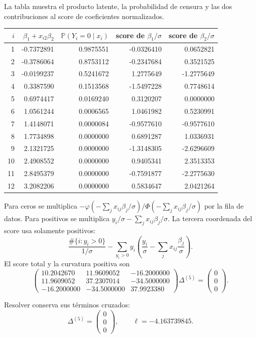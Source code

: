 \documentclass[11pt,a4paper]{article}
\newcommand{\Prob}{\mathbb P}
\begin{document}
La tabla muestra el producto latente,
la probabilidad de censura y
las dos contribuciones al score
de coeficientes normalizados.
\begin{center}\small\begin{tabular}{rrrrr}\toprule
\(i\)&\(\beta_1+x_{i2}\beta_2\)&\(\Prob(Y_i=0\mid x_i)\)&score de \(\beta_1/\sigma\)&score de \(\beta_2/\sigma\)\\\midrule
1&-0.7372891&0.9875551&-0.0326410&0.0652821\\
2&-0.3786064&0.8753112&-0.2347684&0.3521525\\
3&-0.0199237&0.5241672&1.2775649&-1.2775649\\
4&0.3387590&0.1513568&-1.5497228&0.7748614\\
5&0.6974417&0.0169240&0.3120207&0.0000000\\
6&1.0561244&0.0006565&1.0461982&0.5230991\\
7&1.4148071&0.0000084&-0.9577610&-0.9577610\\
8&1.7734898&0.0000000&0.6891287&1.0336931\\
9&2.1321725&0.0000000&-1.3148305&-2.6296609\\
10&2.4908552&0.0000000&0.9405341&2.3513353\\
11&2.8495379&0.0000000&-0.7591877&-2.2775630\\
12&3.2082206&0.0000000&0.5834647&2.0421264\\\bottomrule\end{tabular}\end{center}
Para ceros se multiplica
\(-\varphi(-\sum_jx_{ij}\beta_j/\sigma)/
\Phi(-\sum_jx_{ij}\beta_j/\sigma)\)
por la fila de datos.
Para positivos se multiplica
\(y_i/\sigma-\sum_jx_{ij}\beta_j/\sigma\).
La tercera coordenada del score
usa solamente positivos:
\[
\frac{\#\{i:y_i>0\}}{1/\sigma}
-\sum_{y_i>0}y_i\left(\frac{y_i}{\sigma}
-\sum_jx_{ij}\frac{\beta_j}{\sigma}\right).
\]
El score total y la curvatura positiva son
\[
\begin{pmatrix}10.2042670&11.9609052&-16.2000000\\11.9609052&37.2307014&-34.5000000\\-16.2000000&-34.5000000&37.9923380\end{pmatrix}\Delta^{(5)}=\begin{pmatrix}0\\0\\0\end{pmatrix}.
\]

Resolver conserva sus términos cruzados:
\[
\Delta^{(5)}=\begin{pmatrix}0\\0\\0\end{pmatrix},\qquad\ell=-4.163739845.
\]
\end{document}
